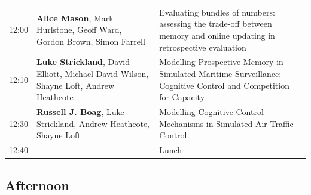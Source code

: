 \documentclass[]{article}
\begin{document}
\begin{longtable}[]{@{}lll@{}}
\begin{minipage}[t]{0.03\columnwidth}
12:00\strut
\end{minipage} & \begin{minipage}[t]{0.38\columnwidth}\raggedright\strut
\textbf{Alice Mason}, Mark Hurlstone, Geoff Ward, Gordon Brown, Simon
Farrell\strut
\end{minipage} & \begin{minipage}[t]{0.51\columnwidth}\raggedright\strut
Evaluating bundles of numbers: assessing the trade-off between memory
and online updating in retrospective evaluation\strut
\end{minipage}\tabularnewline
\begin{minipage}[t]{0.03\columnwidth}\raggedright\strut
12:10\strut
\end{minipage} & \begin{minipage}[t]{0.38\columnwidth}\raggedright\strut
\textbf{Luke Strickland}, David Elliott, Michael David Wilson, Shayne
Loft, Andrew Heathcote\strut
\end{minipage} & \begin{minipage}[t]{0.51\columnwidth}\raggedright\strut
Modelling Prospective Memory in Simulated Maritime Surveillance:
Cognitive Control and Competition for Capacity\strut
\end{minipage}\tabularnewline
\begin{minipage}[t]{0.03\columnwidth}\raggedright\strut
12:30\strut
\end{minipage} & \begin{minipage}[t]{0.38\columnwidth}\raggedright\strut
\textbf{Russell J. Boag}, Luke Strickland, Andrew Heathcote, Shayne
Loft\strut
\end{minipage} & \begin{minipage}[t]{0.51\columnwidth}\raggedright\strut
Modelling Cognitive Control Mechanisms in Simulated Air-Traffic
Control\strut
\end{minipage}\tabularnewline
\begin{minipage}[t]{0.03\columnwidth}\raggedright\strut
12:40\strut
\end{minipage} & \begin{minipage}[t]{0.38\columnwidth}\raggedright\strut
\strut
\end{minipage} & \begin{minipage}[t]{0.51\columnwidth}\raggedright\strut
Lunch\strut
\end{minipage}\tabularnewline
\bottomrule
\end{longtable}

\subsection{Afternoon}\label{afternoon}
\end{document}
